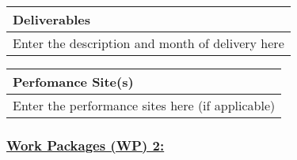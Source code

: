 \documentclass[a4paper,11pt]{nprp}
\newlength{\realwidth}
\begin{document}
\begin{center}
\vspace{1em}

\begin{tabular}{|p{1\realwidth}|}
\hline
\textbf{Deliverables} \\
\hline
Enter the description and month of delivery here \\
\hline
\end{tabular}

\vspace{1em}

\begin{tabular}{|p{1\realwidth}|}
\hline
\textbf{Perfomance Site(s)} \\
\hline
Enter the performance sites here (if applicable) \\
\hline
\end{tabular}

\end{center}


\subsubsection{\underline{Work Packages (WP) 2:}}
\end{document}
